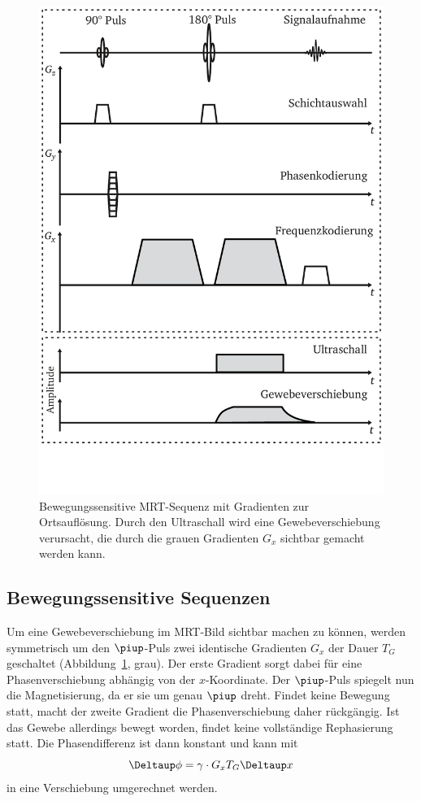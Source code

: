 \documentclass[
    11pt,
    ngerman
]{scrbook}
\begin{document}
\begin{figure}
    \centering
    \includegraphics[width=.7\textwidth]{Abbildungen/sediffmono.pdf}
    \caption{%
        Bewegungssensitive MRT-Sequenz mit Gradienten zur Ortsauflösung. Durch den Ultraschall wird eine Gewebeverschiebung verursacht, die durch die grauen Gradienten $G_x$ sichtbar gemacht werden kann.
    }
    \label{fig:bew-sens-sequenz}
\end{figure}

\subsection{Bewegungssensitive Sequenzen}

Um eine Gewebeverschiebung im MRT-Bild sichtbar machen zu können, werden symmetrisch um den $\piup$-Puls zwei identische Gradienten $G_x$ der Dauer $T_G$ geschaltet (Abbildung~\ref{fig:bew-sens-sequenz}, grau). Der erste Gradient sorgt dabei für eine Phasenverschiebung abhängig von der $x$-Koordinate. Der $\piup$-Puls spiegelt nun die Magnetisierung, da er sie um genau $\piup$ dreht. Findet keine Bewegung statt, macht der zweite Gradient die Phasenverschiebung daher rückgängig. Ist das Gewebe allerdings bewegt worden, findet keine vollständige Rephasierung statt. Die Phasendifferenz ist dann konstant und kann mit
\begin{equation}
    \Deltaup \phi = \gamma \cdot G_x T_G \Deltaup x \label{eq:phi_x}
\end{equation}
in eine Verschiebung umgerechnet werden.
\end{document}
